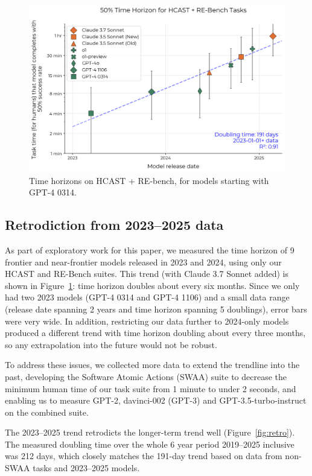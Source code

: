 \documentclass{article}
\newcommand{\gabenchmark}{HCAST}
\begin{document}
\begin{figure}
    \centering
    \includegraphics[width=0.8\linewidth]{plots/logistic/single_line_2023_ga_rebench.png}
    \caption{Time horizons on \gabenchmark{} + RE-bench, for models starting with GPT-4 0314.}
    \label{fig:2023}
\end{figure}

\subsection{Retrodiction from 2023--2025 data} \label{sec:retrodiction}


As part of exploratory work for this paper, we measured the time horizon of 9 frontier and near-frontier models released in 2023 and 2024, using only our \gabenchmark{} and RE-Bench suites. This trend (with Claude 3.7 Sonnet added) is shown in Figure~\ref{fig:2023}: time horizon doubles about every six months. Since we only had two 2023 models (GPT-4 0314 and GPT-4 1106) and a small data range (release date spanning 2 years and time horizon spanning 5 doublings), error bars were very wide. In addition, restricting our data further to 2024-only models produced a different trend with time horizon doubling about every three months, so any extrapolation into the future would not be robust.

To address these issues, we collected more data to extend the trendline into the past, developing the Software Atomic Actions (SWAA) suite to decrease the minimum human time of our task suite from 1 minute to under 2 seconds, and enabling us to measure GPT-2, davinci-002 (GPT-3) and GPT-3.5-turbo-instruct on the combined suite.

The 2023--2025 trend retrodicts the longer-term trend well (Figure~\ref{fig:retro}). The measured doubling time over the whole 6 year period 2019--2025 inclusive was 212 days, which closely matches the 191-day trend based on data from non-SWAA tasks and 2023--2025 models.
\end{document}
